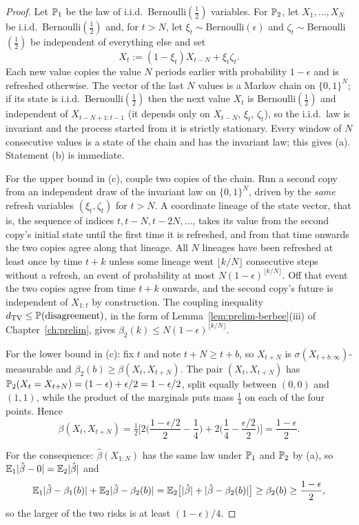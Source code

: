 \documentclass[../../../main.tex]{subfiles}
\begin{document}
\begin{proof}
Let $\mathbb{P}_1$ be the law of i.i.d.\ Bernoulli$(\tfrac12)$ variables. For $\mathbb{P}_2$, let $X_1,\dots,X_N$ be i.i.d.\ Bernoulli$(\tfrac12)$ and, for $t>N$, let $\xi_t\sim$Bernoulli$(\epsilon)$ and $\zeta_t\sim$Bernoulli$(\tfrac12)$ be independent of everything else and set
\[
X_t:=(1-\xi_t)X_{t-N}+\xi_t\zeta_t .
\]
Each new value copies the value $N$ periods earlier with probability $1-\epsilon$ and is refreshed otherwise. The vector of the last $N$ values is a Markov chain on $\{0,1\}^N$; if its state is i.i.d.\ Bernoulli$(\tfrac12)$ then the next value $X_t$ is Bernoulli$(\tfrac12)$ and independent of $X_{t-N+1:t-1}$ (it depends only on $X_{t-N}$, $\xi_t$, $\zeta_t$), so the i.i.d.\ law is invariant and the process started from it is strictly stationary. Every window of $N$ consecutive values is a state of the chain and has the invariant law; this gives (a). Statement (b) is immediate.

For the upper bound in (c), couple two copies of the chain. Run a second copy from an independent draw of the invariant law on $\{0,1\}^N$, driven by the \emph{same} refresh variables $(\xi_t,\zeta_t)$ for $t>N$. A coordinate lineage of the state vector, that is, the sequence of indices $t,t-N,t-2N,\dots$, takes its value from the second copy's initial state until the first time it is refreshed, and from that time onwards the two copies agree along that lineage. All $N$ lineages have been refreshed at least once by time $t+k$ unless some lineage went $\lfloor k/N\rfloor$ consecutive steps without a refresh, an event of probability at most $N(1-\epsilon)^{\lfloor k/N\rfloor}$. Off that event the two copies agree from time $t+k$ onwards, and the second copy's future is independent of $X_{1:t}$ by construction. The coupling inequality $d_{\mathrm{TV}}\le\mathbb{P}(\text{disagreement})$, in the form of Lemma~\ref{lem:prelim-berbee}(iii) of Chapter~\ref{ch:prelim}, gives $\beta_2(k)\le N(1-\epsilon)^{\lfloor k/N\rfloor}$.

For the lower bound in (c): fix $t$ and note $t+N\ge t+b$, so $X_{t+N}$ is $\sigma(X_{t+b:\infty})$-measurable and $\beta_2(b)\ge\beta(X_t,X_{t+N})$. The pair $(X_t,X_{t+N})$ has $\mathbb{P}_2(X_t=X_{t+N})=(1-\epsilon)+\epsilon/2=1-\epsilon/2$, split equally between $(0,0)$ and $(1,1)$, while the product of the marginals puts mass $\tfrac14$ on each of the four points. Hence
\[
\beta(X_t,X_{t+N})=\tfrac12\Big[2\Big(\frac{1-\epsilon/2}{2}-\frac14\Big)+2\Big(\frac14-\frac{\epsilon/2}{2}\Big)\Big]=\frac{1-\epsilon}{2}.
\]

For the consequence: $\hat\beta(X_{1:N})$ has the same law under $\mathbb{P}_1$ and $\mathbb{P}_2$ by (a), so $\mathbb{E}_1|\hat\beta-0|=\mathbb{E}_2|\hat\beta|$ and
\[
\mathbb{E}_1|\hat\beta-\beta_1(b)|+\mathbb{E}_2|\hat\beta-\beta_2(b)|=\mathbb{E}_2\big[|\hat\beta|+|\hat\beta-\beta_2(b)|\big]\ge\beta_2(b)\ge\frac{1-\epsilon}2 ,
\]
so the larger of the two risks is at least $(1-\epsilon)/4$.
\end{proof}
\end{document}
